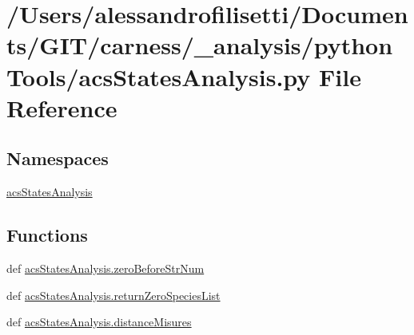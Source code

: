 \hypertarget{a00047}{\section{/\-Users/alessandrofilisetti/\-Documents/\-G\-I\-T/carness/\-\_\-analysis/python\-Tools/acs\-States\-Analysis.py File Reference}
\label{a00047}
}
\subsection*{Namespaces}
\begin{DoxyCompactItemize}
\item 
\hyperlink{a00130}{acs\-States\-Analysis}
\end{DoxyCompactItemize}
\subsection*{Functions}
\begin{DoxyCompactItemize}
\item 
def \hyperlink{a00130_aeeb6d629132a9755b45a3008d445419c}{acs\-States\-Analysis.\-zero\-Before\-Str\-Num}
\item 
def \hyperlink{a00130_ad7c75c1e146fa51da42274cf7d5747d0}{acs\-States\-Analysis.\-return\-Zero\-Species\-List}
\item 
def \hyperlink{a00130_a76768d52780b1415a920dc94b3c991c0}{acs\-States\-Analysis.\-distance\-Misures}
\end{DoxyCompactItemize}
